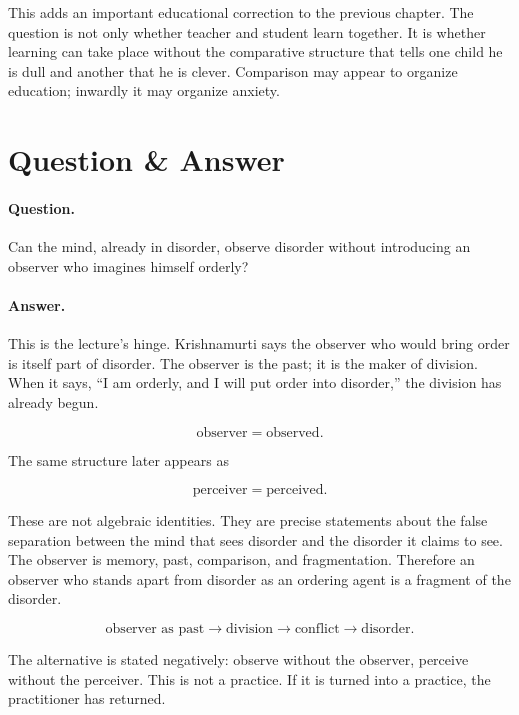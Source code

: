 \documentclass[11pt,oneside]{book}
\begin{document}
This adds an important educational correction to the previous chapter. The question is not only whether teacher and student learn together. It is whether learning can take place without the comparative structure that tells one child he is dull and another that he is clever. Comparison may appear to organize education; inwardly it may organize anxiety.

\section{Question \& Answer}

\paragraph{Question.}
Can the mind, already in disorder, observe disorder without introducing an observer who imagines himself orderly?

\paragraph{Answer.}
This is the lecture's hinge. Krishnamurti says the observer who would bring order is itself part of disorder. The observer is the past; it is the maker of division. When it says, ``I am orderly, and I will put order into disorder,'' the division has already begun.

\begin{equation}
\text{observer}=\text{observed}.
\end{equation}

The same structure later appears as

\begin{equation}
\text{perceiver}=\text{perceived}.
\end{equation}

These are not algebraic identities. They are precise statements about the false separation between the mind that sees disorder and the disorder it claims to see. The observer is memory, past, comparison, and fragmentation. Therefore an observer who stands apart from disorder as an ordering agent is a fragment of the disorder.

\begin{equation}
\text{observer as past}
\longrightarrow
\text{division}
\longrightarrow
\text{conflict}
\longrightarrow
\text{disorder}.
\end{equation}

The alternative is stated negatively: observe without the observer, perceive without the perceiver. This is not a practice. If it is turned into a practice, the practitioner has returned.
\end{document}
